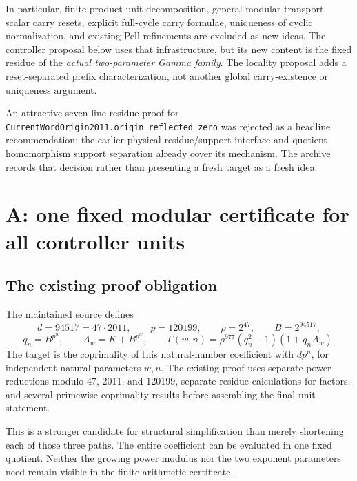 \documentclass[11pt]{article}
\newcommand{\code}[1]{\nolinkurl{#1}}
\begin{document}
In particular, finite product-unit decomposition, general modular transport,
scalar carry resets, explicit full-cycle carry formulae, uniqueness of cyclic
normalization, and existing Pell refinements are excluded as new ideas. The
controller proposal below uses that infrastructure, but its new content is the
fixed residue of the \emph{actual two-parameter Gamma family}. The locality
proposal adds a reset-separated prefix characterization, not another global
carry-existence or uniqueness argument.

An attractive seven-line residue proof for
\code{CurrentWordOrigin2011.origin_reflected_zero} was rejected as a headline
recommendation: the earlier physical-residue/support interface and
quotient-homomorphism support separation already cover its mechanism. The
archive records that decision rather than presenting a fresh target as a fresh
idea.

\section{A: one fixed modular certificate for all controller units}
\subsection{The existing proof obligation}
The maintained source defines
\[
 d=94517=47\cdot2011,\qquad p=120199,\qquad
 \rho=2^{47},\qquad B=2^{94517},
\]
\[
 q_n=B^{p^n},\qquad A_w=K+B^{p^w},\qquad
 \Gamma(w,n)=\rho^{977}(q_n^2-1)(1+q_n A_w).
\]
The target is the coprimality of this natural-number coefficient with
\(d p^n\), for independent natural parameters \(w,n\). The existing proof uses
separate power reductions modulo 47, 2011, and 120199, separate residue
calculations for factors, and several primewise coprimality results before
assembling the final unit statement.\cite{units}

This is a stronger candidate for structural simplification than merely
shortening each of those three paths. The entire coefficient can be evaluated
in one fixed quotient. Neither the growing power modulus nor the two exponent
parameters need remain visible in the finite arithmetic certificate.
\end{document}
